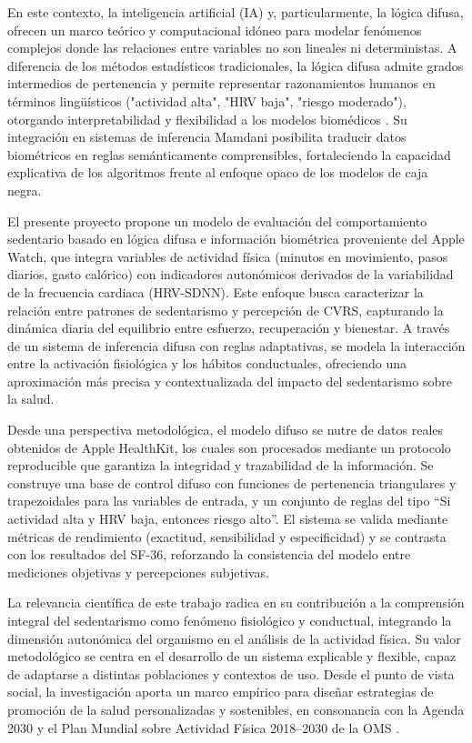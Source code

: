 En este contexto, la inteligencia artificial (IA) y, particularmente, la lógica difusa, ofrecen un marco teórico y computacional idóneo para modelar fenómenos complejos donde las relaciones entre variables no son lineales ni deterministas. A diferencia de los métodos estadísticos tradicionales, la lógica difusa admite grados intermedios de pertenencia y permite representar razonamientos humanos en términos lingüísticos ("actividad alta", "HRV baja", "riesgo moderado"), otorgando interpretabilidad y flexibilidad a los modelos biomédicos \cite{Zadeh1965,Ross2010,Kaur2022}. Su integración en sistemas de inferencia Mamdani posibilita traducir datos biométricos en reglas semánticamente comprensibles, fortaleciendo la capacidad explicativa de los algoritmos frente al enfoque opaco de los modelos de caja negra.

El presente proyecto propone un modelo de evaluación del comportamiento sedentario basado en lógica difusa e información biométrica proveniente del Apple Watch, que integra variables de actividad física (minutos en movimiento, pasos diarios, gasto calórico) con indicadores autonómicos derivados de la variabilidad de la frecuencia cardiaca (HRV-SDNN). Este enfoque busca caracterizar la relación entre patrones de sedentarismo y percepción de CVRS, capturando la dinámica diaria del equilibrio entre esfuerzo, recuperación y bienestar. A través de un sistema de inferencia difusa con reglas adaptativas, se modela la interacción entre la activación fisiológica y los hábitos conductuales, ofreciendo una aproximación más precisa y contextualizada del impacto del sedentarismo sobre la salud.

Desde una perspectiva metodológica, el modelo difuso se nutre de datos reales obtenidos de Apple HealthKit, los cuales son procesados mediante un protocolo reproducible que garantiza la integridad y trazabilidad de la información. Se construye una base de control difuso con funciones de pertenencia triangulares y trapezoidales para las variables de entrada, y un conjunto de reglas del tipo “Si actividad alta y HRV baja, entonces riesgo alto”. El sistema se valida mediante métricas de rendimiento (exactitud, sensibilidad y especificidad) y se contrasta con los resultados del SF-36, reforzando la consistencia del modelo entre mediciones objetivas y percepciones subjetivas.

La relevancia científica de este trabajo radica en su contribución a la comprensión integral del sedentarismo como fenómeno fisiológico y conductual, integrando la dimensión autonómica del organismo en el análisis de la actividad física. Su valor metodológico se centra en el desarrollo de un sistema explicable y flexible, capaz de adaptarse a distintas poblaciones y contextos de uso. Desde el punto de vista social, la investigación aporta un marco empírico para diseñar estrategias de promoción de la salud personalizadas y sostenibles, en consonancia con la Agenda 2030 y el Plan Mundial sobre Actividad Física 2018–2030 de la OMS \cite{WHO2018}.

